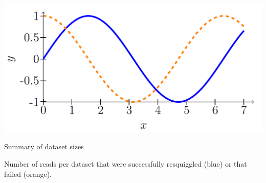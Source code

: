 \documentclass{article}
\begin{document}
\newpage
\setcounter{page}{1}
\setcounter{linenumber}{1}
\listofsuppfigures
\newpage

\begin{suppfigure}[ht!]
    \centering
    \includegraphics[scale=0.10]{figures/supfig1.png}
    \caption{Summary of dataset sizes}
    {Number of reads per dataset that were successfully resquiggled (blue) or that failed (orange).}
\end{suppfigure}
\end{document}
